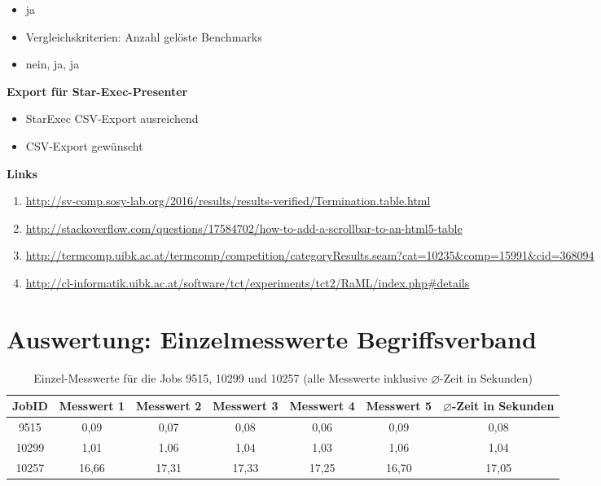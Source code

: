 \begin{itemize}
\tightlist
\item
  ja
\item
  Vergleichskriterien: Anzahl gelöste Benchmarks
\item
  nein, ja, ja
\end{itemize}

\textbf{Export für Star-Exec-Presenter}

\begin{itemize}
\tightlist
\item
  StarExec CSV-Export ausreichend
\item
  CSV-Export gewünscht
\end{itemize}

\textbf{Links}

\begin{enumerate}
\def\labelenumi{\arabic{enumi}.}
\tightlist
\item
  \url{http://sv-comp.sosy-lab.org/2016/results/results-verified/Termination.table.html}
\item
  \url{http://stackoverflow.com/questions/17584702/how-to-add-a-scrollbar-to-an-html5-table}
\item
  \url{http://termcomp.uibk.ac.at/termcomp/competition/categoryResults.seam?cat=10235&comp=15991&cid=368094}
\item
  \url{http://cl-informatik.uibk.ac.at/software/tct/experiments/tct2/RaML/index.php#details}
\end{enumerate}

\newpage

\section{\texorpdfstring{Auswertung: Einzelmesswerte Begriffsverband
\label{appendix:tab:measurement-detail}}{Auswertung: Einzelmesswerte Begriffsverband }}\label{auswertung-einzelmesswerte-begriffsverband}

\begin{table}[h]
\centering
\begin{tabular}{ccccccc}
\hline
JobID & Messwert 1 & Messwert 2 & Messwert 3 & Messwert 4 & Messwert 5 & $\varnothing$-Zeit in Sekunden \\ \hline
9515  & 0,09 & 0,07 & 0,08 & 0,06 & 0,09 & 0,08            \\
10299  & 1,01 & 1,06 & 1,04 & 1,03 & 1,06 & 1,04            \\
10257  & 16,66 & 17,31 & 17,33 & 17,25 & 16,70 & 17,05       \\\hline
\end{tabular}
\caption{Einzel-Messwerte für die Jobs 9515, 10299 und 10257 (alle Messwerte inklusive $\varnothing$-Zeit in Sekunden)}
\label{tab:measurement-detail}
\end{table}


